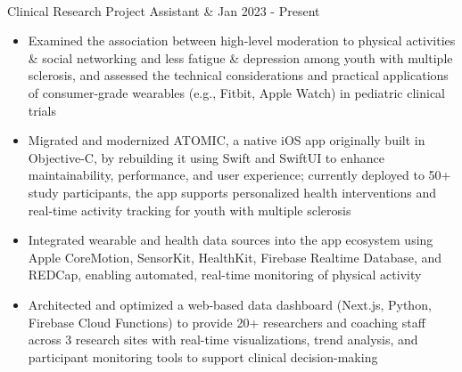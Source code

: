 \documentclass[letterpaper,11pt]{article} %
\newcommand{\resumeItem}[1]{\small{#1}\vspace{-5pt}}
\begin{document}
\vspace{5pt}
\begin{tabular*}
    \vspace{1pt}\\
    {Clinical Research Project Assistant} & {\color{TextBlack} \small Jan 2023 - Present}\\
\end{tabular*}
\vspace{-10pt}
\begin{itemize}
    \item\resumeItem{Examined the association between high-level moderation to physical activities \& social networking and less fatigue \& depression among youth with multiple sclerosis, and assessed the technical considerations and practical applications of consumer-grade wearables (e.g., Fitbit, Apple Watch) in pediatric clinical trials}
    \item\resumeItem{Migrated and modernized ATOMIC, a native iOS app originally built in Objective-C, by rebuilding it using Swift and SwiftUI to enhance maintainability, performance, and user experience; currently deployed to 50+ study participants, the app supports personalized health interventions and real-time activity tracking for youth with multiple sclerosis}
    \item\resumeItem{Integrated wearable and health data sources into the app ecosystem using Apple CoreMotion, SensorKit, HealthKit, Firebase Realtime Database, and REDCap, enabling automated, real-time monitoring of physical activity}
    \item\resumeItem{Architected and optimized a web-based data dashboard (Next.js, Python, Firebase Cloud Functions) to provide 20+ researchers and coaching staff across 3 research sites with real-time visualizations, trend analysis, and participant monitoring tools to support clinical decision-making}
\end{itemize}
\end{document}
